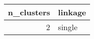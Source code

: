 \begin{tabular}{rl}
\toprule
n_clusters & linkage \\
\midrule
2 & single \\
\bottomrule
\end{tabular}
